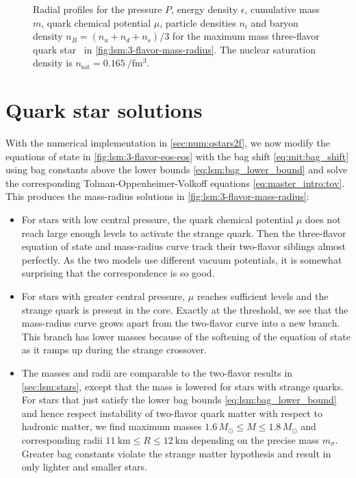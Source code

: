 \begin{figure}
\caption{\label{fig:lsm:3-flavor-star}%
	Radial profiles for the
	pressure $P$,
	energy density $\epsilon$,
	cumulative mass $m$,
	quark chemical potential $\mu$,
	particle densities $n_i$
	and baryon density $n_B = (n_u+n_d+n_s)/3$
	for the maximum mass three-flavor quark star \goldenstar in \cref{fig:lsm:3-flavor-mass-radius}.
	The nuclear saturation density is $n_\text{sat} = \SI{0.165}{\per\femto\meter\cubed}$.
}

\end{figure}

\section{Quark star solutions}

With the numerical implementation in \cref{sec:num:qstars2f},
we now modify the equations of state in \cref{fig:lsm:3-flavor-eos-eos}
with the bag shift \eqref{eq:mit:bag_shift}
using bag constants above the lower bounds \eqref{eq:lsm:bag_lower_bound}
and solve the corresponding Tolman-Oppenheimer-Volkoff equations \eqref{eq:master_intro:tov}.
This produces the mass-radius solutions in \cref{fig:lsm:3-flavor-mass-radius}:
\begin{itemize}
\item For stars with low central pressure,
      the quark chemical potential $\mu$ does not reach large enough levels to activate the strange quark.
      Then the three-flavor equation of state and mass-radius curve track their two-flavor siblings almost perfectly.
      As the two models use different vacuum potentials, it is somewhat surprising that the correspondence is so good.
\item For stars with greater central pressure, $\mu$ reaches sufficient levels and the strange quark is present in the core.
      Exactly at the threshold, we see that the mass-radius curve grows apart from the two-flavor curve into a new branch.
      This branch has lower masses because of the softening of the equation of state as it ramps up during the strange crossover.
\item The masses and radii are comparable to the two-flavor results in \cref{sec:lsm:stars}, except that the mass is lowered for stars with strange quarks.
      For stars that just satisfy the lower bag bounds \eqref{eq:lsm:bag_lower_bound} and hence respect instability of two-flavor quark matter with respect to hadronic matter,
      we find maximum masses $1.6 \, M_\odot\leq M \leq 1.8 \, M_\odot$ and corresponding radii $\SI{11}{\kilo\meter} \leq R \leq \SI{12}{\kilo\meter}$ depending on the precise mass $m_\sigma$.
      Greater bag constants violate the strange matter hypothesis and result in only lighter and smaller stars.
\end{itemize}

